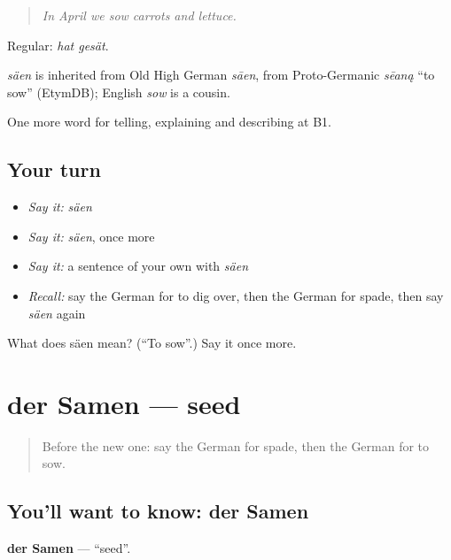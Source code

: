\begin{quote}
\emph{In April we sow carrots and lettuce.}
\end{quote}

Regular: \emph{hat gesät}.

\begin{cousinweb}
\emph{säen} is inherited from Old High German \emph{sāen}, from Proto-Germanic \emph{sēaną} \textquotedblleft{}to sow\textquotedblright{} (EtymDB); English \emph{sow} is a cousin.
\end{cousinweb}

\begin{grammarlens}[title={What you've built}]
One more word for telling, explaining and describing at B1.
\end{grammarlens}

\subsection*{Your turn}
\begin{itemize}
\raggedright
  \item \emph{Say it:} \emph{säen}
  \item \emph{Say it:} \emph{säen}, once more
  \item \emph{Say it:} a sentence of your own with \emph{säen}
  \item \emph{Recall:} say the German for to dig over, then the German for spade, then say \emph{säen} again
\end{itemize}

\begin{tcolorbox}[breakable,colback=teal!4,colframe=teal!35!black,title={Before you move on}]
What does säen mean? (\textquotedblleft{}To sow\textquotedblright{}.) Say it once more.
\end{tcolorbox}
\section[der Samen]{der Samen — seed}

\label{lesson:GE-C504-samen}



\begin{quote}
Before the new one: say the German for spade, then the German for to sow.
\end{quote}

\subsection*{You'll want to know: der Samen}
\textbf{der Samen} — \textquotedblleft{}seed\textquotedblright{}.

